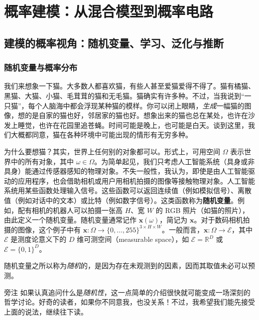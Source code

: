 \chapter{概率建模：从混合模型到概率电路}
\label{ch:probabilistic-modeling}

\section{建模的概率视角：随机变量、学习、泛化与推断}
\label{sec:probabilistic-perspective}
\subsection{随机变量与概率分布}
我们来想象一下猫。大多数人都喜欢猫，有些人甚至爱猫爱得不得了。猫有橘猫、黑猫、大猫、小猫、毛茸茸的猫和无毛猫。猫确实有许多种。不过，当我说到“一只猫”，每个人脑海中都会浮现某种猫的模样。你可以闭上眼睛，\emph{生成}一幅猫的图像，想的是自家的猫也好，邻居家的猫也好。想象出来的猫也总在某处，也许在沙发上睡觉，也许在花园里追苍蝇。时间可能是晚上，也可能是白天。谈到这里，我们大概都同意，猫在各种环境中可能出现的情形有无穷多种。

为什么要想猫？其实，世界上任何别的对象都可以。形式上，可用空间 $\Omega$ 表示世界中的所有对象，其中 $\omega\in\Omega$。为简单起见，我们只考虑人工智能系统（具身或非具身）能通过传感器感知的物理对象。不失一般性，我认为，即使是由人工智能驱动的应用程序，也会借助相机或用户用相机拍摄的图像等接触物理对象。人工智能系统用某些函数处理输入信号。这些函数可以返回连续值（例如模拟信号）、离散值（例如对话中的文本）或比特（例如数字信号）。这类函数称为\textbf{随机变量}。例如，配有相机的机器人可以拍摄一张高 $H$、宽 $W$ 的 RGB 照片（如猫的照片），由此定义一个随机变量。随机变量通常记作 $\mathbf{x}(\omega)$，简记为 $\mathbf{x}$。对于数码相机拍摄的图像，这个例子中有 $\mathbf{x}\colon\Omega\to\{0,\ldots,255\}^{3\times H\times W}$。一般而言，$\mathbf{x}\colon\Omega\to\mathcal{E}$，其中 $\mathcal{E}$ 是测度论意义下的 $D$ 维可测空间（measurable space），如 $\mathcal{E}=\mathbb{R}^{D}$ 或 $\mathcal{E}=\{0,1\}^{D}$。

随机变量之所以称为\emph{随机}的，是因为存在未观测到的因素，因而其取值未必可以预测。

\begin{booknote}{旁注}
如果认真追问什么是\emph{随机性}，这一点简单的介绍很快就可能变成一场深刻的哲学讨论。好奇的读者，如果你不同意我，也没关系！不过，我希望我们能先接受上面的说法，继续往下读。
\end{booknote}

